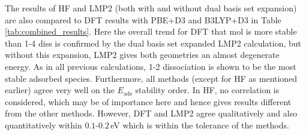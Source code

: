 \documentclass[11pt,DIV=13,BCOR=5mm,a4paper,headinclude]{scrbook}
\begin{document}
The results of HF and LMP2 (both with and without dual basis set expansion) are also compared to DFT results with PBE+D3 and B3LYP+D3 in Table \ref{tab:combined_results}.
Here the overall trend for DFT that mol is more stable than 1-4 diss is confirmed by the dual basis set expanded LMP2 calculation, but without this expansion, LMP2 gives both geometries an almost degenerate energy.
As in all previous calculations, 1-2 dissociation is shown to be the most stable  adsorbed species.
Furthermore, all methods (except for HF as mentioned earlier) agree very well on the $E_\textrm{ads}$ stability order.
In HF, no correlation is considered, which may be of importance here and hence gives results different from the other methods.
However, DFT and LMP2 agree qualitatively and also quantitatively within $0.1$-$0.2\,$eV which is within the tolerance of the methods.
\end{document}
